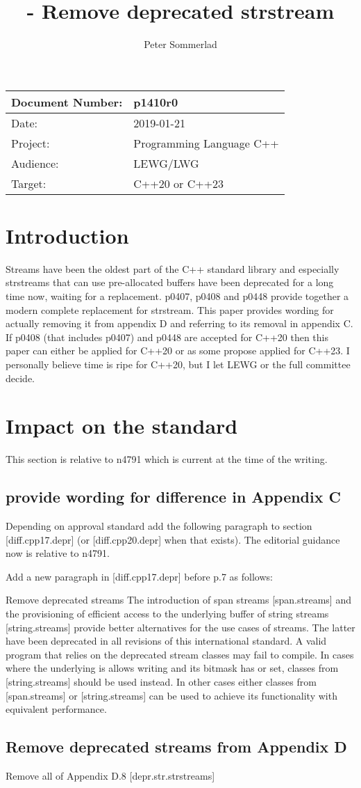 \documentclass[ebook,11pt,article]{memoir}
\title{\papernumber{} - Remove deprecated strstream}
\author{Peter Sommerlad}
\date{\paperdate}                %
\newcommand{\papernumber}{p1410r0}
\newcommand{\paperdate}{2019-01-21}
\begin{document}
\maketitle
\begin{center}
\begin{tabular}[t]{|l|l|}\hline 
Document Number:&  \papernumber \hfill \\\hline
Date: & \paperdate \\\hline
Project: & Programming Language C++\\\hline 
Audience: & LEWG/LWG\\\hline
Target: & C++20 or C++23\\\hline
\end{tabular}
\end{center}
\chapter{Introduction}
Streams have been the oldest part of the C++ standard library and especially strstreams that can use pre-allocated buffers have been deprecated for a long time now, waiting for a replacement. p0407, p0408 and p0448 provide together a modern complete replacement for strstream. This paper provides wording for actually removing it from appendix D and referring to its removal in appendix C. If p0408 (that includes p0407) and p0448 are accepted for C++20 then this paper can either be applied for C++20 or as some propose applied for C++23. I personally believe time is ripe for C++20, but I let LEWG or the full committee decide.

\chapter{Impact on the standard}
This section is relative to n4791 which is current at the time of the writing.

\section{provide wording for difference in Appendix C}
Depending on approval standard add the following paragraph to section [diff.cpp17.depr] (or [diff.cpp20.depr] when that exists). The editorial guidance now is relative to n4791.

Add a new paragraph in [diff.cpp17.depr] before p.7 as follows:

\nodiffref
\change Remove deprecated  streams 
\rationale
The introduction of span streams [span.streams] and the provisioning of efficient access to the underlying buffer of string streams [string.streams] provide better alternatives for the use cases of  streams. The latter have been deprecated in all revisions of this international standard.
\effect
A valid \CppXVII{} program that relies on the deprecated  stream classes may fail to compile.
In cases where the underlying  is allows writing and its  bitmask has  or  set, classes from [string.streams] should be used instead. In other cases either classes from [span.streams] or [string.streams] can be used to achieve its functionality with equivalent performance.

\section{Remove deprecated  streams from Appendix D}
Remove all of Appendix D.8  [depr.str.strstreams]
\end{document}
